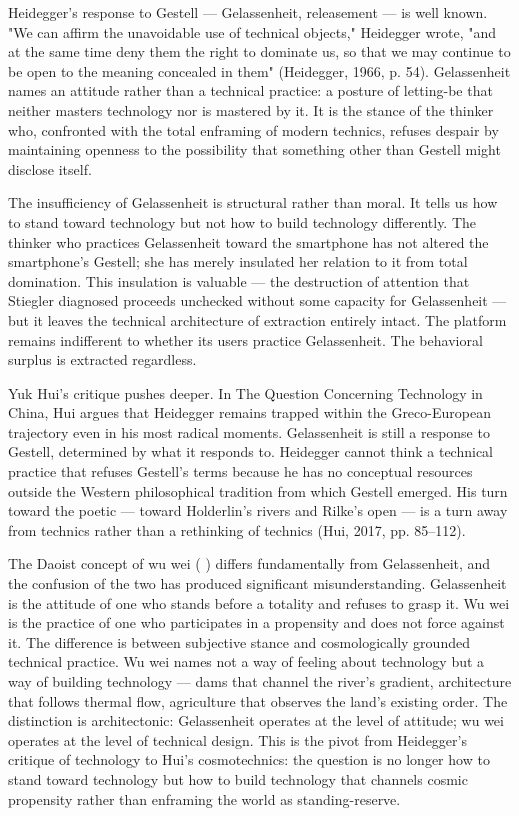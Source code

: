 Heidegger's response to Gestell — Gelassenheit, releasement — is well known. "We can affirm the unavoidable use of technical objects," Heidegger wrote, "and at the same time deny them the right to dominate us, so that we may continue to be open to the meaning concealed in them" (Heidegger, 1966, p. 54). Gelassenheit names an attitude rather than a technical practice: a posture of letting-be that neither masters technology nor is mastered by it. It is the stance of the thinker who, confronted with the total enframing of modern technics, refuses despair by maintaining openness to the possibility that something other than Gestell might disclose itself.

The insufficiency of Gelassenheit is structural rather than moral. It tells us how to stand toward technology but not how to build technology differently. The thinker who practices Gelassenheit toward the smartphone has not altered the smartphone's Gestell; she has merely insulated her relation to it from total domination. This insulation is valuable — the destruction of attention that Stiegler diagnosed proceeds unchecked without some capacity for Gelassenheit — but it leaves the technical architecture of extraction entirely intact. The platform remains indifferent to whether its users practice Gelassenheit. The behavioral surplus is extracted regardless.

Yuk Hui's critique pushes deeper. In The Question Concerning Technology in China, Hui argues that Heidegger remains trapped within the Greco-European trajectory even in his most radical moments. Gelassenheit is still a response to Gestell, determined by what it responds to. Heidegger cannot think a technical practice that refuses Gestell's terms because he has no conceptual resources outside the Western philosophical tradition from which Gestell emerged. His turn toward the poetic — toward Holderlin's rivers and Rilke's open — is a turn away from technics rather than a rethinking of technics (Hui, 2017, pp. 85–112).

The Daoist concept of wu wei (   ) differs fundamentally from Gelassenheit, and the confusion of the two has produced significant misunderstanding. Gelassenheit is the attitude of one who stands before a totality and refuses to grasp it. Wu wei is the practice of one who participates in a propensity and does not force against it. The difference is between subjective stance and cosmologically grounded technical practice. Wu wei names not a way of feeling about technology but a way of building technology — dams that channel the river's gradient, architecture that follows thermal flow, agriculture that observes the land's existing order. The distinction is architectonic: Gelassenheit operates at the level of attitude; wu wei operates at the level of technical design. This is the pivot from Heidegger's critique of technology to Hui's cosmotechnics: the question is no longer how to stand toward technology but how to build technology that channels cosmic propensity rather than enframing the world as standing-reserve.

